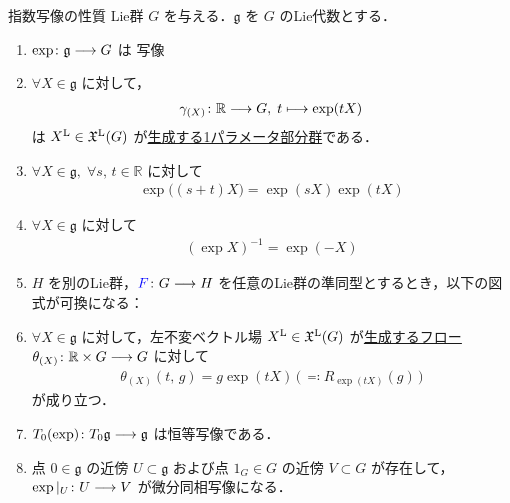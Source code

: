 \documentclass[TQFT_main]{subfiles}
\begin{document}
\begin{myprop}[label=prop:exp]{指数写像の性質}
    Lie群 $G$ を与える．$\mathfrak{g}$ を $G$ のLie代数とする．
    \begin{enumerate}
        \item $\exp \colon \mathfrak{g} \longrightarrow G$ は \cinfty 写像 
        \item $\forall X \in \mathfrak{g}$ に対して，
        \begin{align}
            \gamma_{(X)} \colon \mathbb{R} \longrightarrow G,\; t \longmapsto \exp (tX)
        \end{align}
        は $X^{\mathrm{L}} \in \mathfrak{X}^{\mathrm{L}}(G)$ が\hyperref[prop:one-parameter-basic]{生成する1パラメータ部分群}である．
        \item $\forall X \in \mathfrak{g},\; \forall s,\, t \in \mathbb{R}$ に対して
        \begin{align}
            \exp \bigl( (s+t) X\bigr) = \exp (sX) \exp(tX)
        \end{align}
        
        \item $\forall X \in \mathfrak{g}$ に対して
        \begin{align}
            (\exp X)^{-1} = \exp (-X)
        \end{align}
        

        \item $H$ を別のLie群，$\textcolor{blue}{F} \colon G \longrightarrow H$ を任意のLie群の準同型とするとき，以下の図式が可換になる：
        \begin{center}
        \end{center}
        
        \item $\forall X \in \mathfrak{g}$ に対して，左不変ベクトル場 $X^{\mathrm{L}} \in \mathfrak{X}^{\mathrm{L}}(G)$ が\hyperref[thm:fundamental-flow]{生成するフロー} $\theta_{(X)} \colon \mathbb{R} \times G \longrightarrow G$ に対して 
        \begin{align}
            \theta_{(X)}(t,\, g) = g \exp(tX) \, \bigl(\,\eqqcolon R_{\exp(tX)}(g)\,\bigr)
        \end{align}
        が成り立つ．

        \item $T_0 (\exp) \colon T_0 \mathfrak{g} \longrightarrow \mathfrak{g}$ は恒等写像である．
        \item 点 $0 \in \mathfrak{g}$ の近傍 $U \subset \mathfrak{g}$ および点 $1_G \in G$ の近傍 $V \subset G$ が存在して，$\exp|_U \colon U \longrightarrow V$ が微分同相写像になる．
    \end{enumerate}
\end{myprop}
\end{document}
